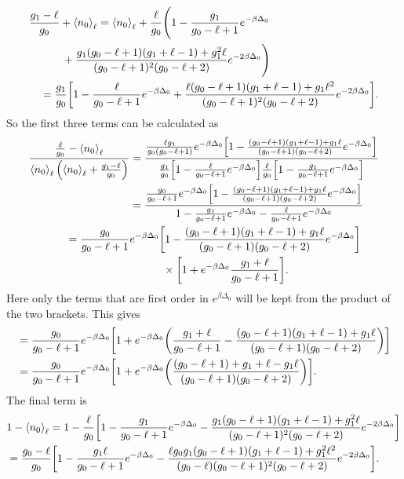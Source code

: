 \begin{align}
    &\frac{g_1-\ell}{g_0}+\left<{n_0}\right>_\ell=\left<{n_0}\right>_\ell+\frac{\ell}{g_0}\Biggr(1-\frac{g_1}{g_0-\ell+1}e^{-\beta\Delta_0}\nonumber\\
    &\quad\quad\quad+\frac{g_1(g_0-\ell+1)(g_1+\ell-1)+g_1^2 \ell}{(g_0-\ell+1)^2(g_0-\ell+2)} e^{-2\beta\Delta_0}\Biggr)\nonumber\\
    &\quad=\frac{g_1}{g_0}\qty[1-\frac{\ell}{g_0-\ell+1}e^{-\beta\Delta_0}+\frac{\ell(g_0-\ell+1)(g_1+\ell-1)+g_1\ell^2}{(g_0-\ell+1)^2(g_0-\ell+2)} e^{-2\beta\Delta_0}].
\end{align}
So the first three terms can be calculated as 
\begin{align}
    \frac{\frac{\ell}{g_0}-\left<{n_0}\right>_\ell}{\left<{n_0}\right>_\ell\qty(\left<{n_0}\right>_\ell+\frac{g_1-\ell}{g_0})}&=\frac{\frac{\ell g_1}{g_0(g_0-\ell+1)}e^{-\beta\Delta_0}\qty[1-\frac{(g_0-\ell+1)(g_1+\ell-1)+g_1\ell}{(g_0-\ell+1)(g_0-\ell+2)}e^{-\beta\Delta_0}]}{\frac{g_1}{g_0}\qty[1-\frac{\ell}{g_0-\ell+1} e^{-\beta\Delta_0}]\frac{\ell}{g_0}\qty[1-\frac{g_1}{g_0-\ell+1} e^{-\beta\Delta_0}]}\nonumber\\
    &=\frac{\frac{g_0}{g_0-\ell+1}e^{-\beta\Delta_0}\qty[1-\frac{(g_0-\ell+1)(g_1+\ell-1)+g_1\ell}{(g_0-\ell+1)(g_0-\ell+2)}e^{-\beta\Delta_0}]}{1-\frac{g_1}{g_0-\ell+1}e^{-\beta\Delta_0}-\frac{\ell}{g_0-\ell+1}e^{-\beta\Delta_0}}\nonumber\\
    =\frac{g_0}{g_0-\ell+1}&e^{-\beta\Delta_0}\qty[1-\frac{(g_0-\ell+1)(g_1+\ell-1)+g_1\ell}{(g_0-\ell+1)(g_0-\ell+2)}e^{-\beta\Delta_0}]\nonumber\\
    &\quad\quad\quad\times\qty[1+e^{-\beta\Delta_0} \frac{g_1+\ell}{g_0-\ell+1}].
\end{align}
Here only the terms that are first order in $e^{\beta\Delta_0}$ will be kept from the product of the two brackets. This gives
\begin{align}
    &=\frac{g_0}{g_0-\ell+1}e^{-\beta\Delta_0}\qty[1+e^{-\beta\Delta_0}\qty(\frac{g_1+\ell}{g_0-\ell+1}-\frac{(g_0-\ell+1)(g_1+\ell-1)+g_1\ell}{(g_0-\ell+1)(g_0-\ell+2)})]\nonumber\\
    &=\frac{g_0}{g_0-\ell+1}e^{-\beta\Delta_0}\qty[1+e^{-\beta\Delta_0}\qty(\frac{(g_0-\ell+1)+g_1+\ell-g_1\ell}{(g_0-\ell+1)(g_0-\ell+2)})].
\end{align}
The final term is
\begin{align}
    &1-\left<{n_0}\right>_\ell=1-\frac{\ell}{g_0}\qty[1-\frac{g_1}{g_0-\ell+1}e^{-\beta\Delta_0}-\frac{g_1(g_0-\ell+1)(g_1+\ell-1)+g_1^2\ell}{(g_0-\ell+1)^2(g_0-\ell+2)}e^{-2\beta\Delta_0}]\nonumber\\
    &=\frac{g_0-\ell}{g_0}\qty[1-\frac{g_1\ell}{g_0-\ell+1}e^{-\beta\Delta_0}-\frac{\ell g_0g_1(g_0-\ell+1)(g_1+\ell-1)+g_1^2\ell^2}{(g_0-\ell)(g_0-\ell+1)^2(g_0-\ell+2)}e^{-2\beta\Delta_0}].
\end{align}
